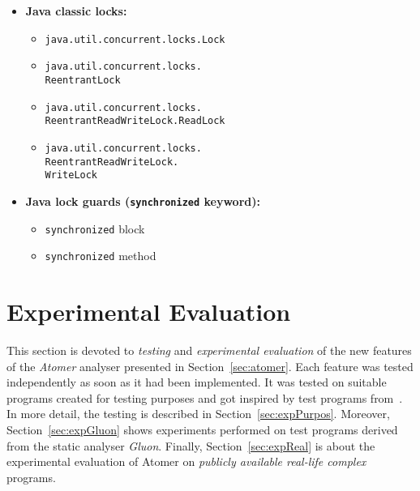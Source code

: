 \begin{itemize}
    \item
        \textbf{Java classic locks:}
        \begin{itemize}
            \item \texttt{java.util.concurrent.locks.Lock}
            \item \texttt{java.util.concurrent.locks.\\ReentrantLock}
            \item \texttt{java.util.concurrent.locks.\\%
                ReentrantReadWriteLock.ReadLock}
            \item \texttt{java.util.concurrent.locks.\\%
                ReentrantReadWriteLock.\\WriteLock}
        \end{itemize}

    \item
        \textbf{Java lock guards (\texttt{synchronized} keyword):}
        \begin{itemize}
            \item \texttt{synchronized} block
            \item \texttt{synchronized} method
        \end{itemize}
\end{itemize}


\section{Experimental Evaluation}
\label{sec:exp}

This section is devoted to \emph{testing} and \emph{experimental evaluation}
of the new features of the \emph{Atomer} analyser presented in
Section~\ref{sec:atomer}. Each feature was tested independently as soon as it
had been implemented. It was tested on suitable programs created for testing
purposes and got inspired by test programs from~\cite{harmimBP}. In more
detail, the testing is described in Section~\ref{sec:expPurpos}. Moreover,
Section~\ref{sec:expGluon} shows experiments performed on test programs
derived from the static analyser \emph{Glu\-on}. Finally,
Section~\ref{sec:expReal} is about the experimental evaluation of Atomer on
\emph{publicly available real-life complex} programs.


